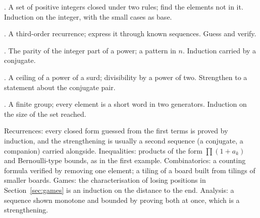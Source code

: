 \begin{ladder}
\item {}. A set of positive integers closed under two rules; find the elements not in it. Induction on the integer, with the small cases as base.
\item {}. A third-order recurrence; express it through known sequences. Guess and verify.
\item {}. The parity of the integer part of a power; a pattern in $n$. Induction carried by a conjugate.
\item {}. A ceiling of a power of a surd; divisibility by a power of two. Strengthen to a statement about the conjugate pair.
\item {}. A finite group; every element is a short word in two generators. Induction on the size of the set reached.
\end{ladder}

\begin{hides}
Recurrences: every closed form guessed from the first terms is proved by induction, and the strengthening is usually a second sequence (a conjugate, a companion) carried alongside. Inequalities: products of the form $\prod (1 + a_k)$ and Bernoulli-type bounds, as in the first example. Combinatorics: a counting formula verified by removing one element; a tiling of a board built from tilings of smaller boards. Games: the characterisation of losing positions in Section~\ref{sec:games} is an induction on the distance to the end. Analysis: a sequence shown monotone and bounded by proving both at once, which is a strengthening.
\end{hides}

